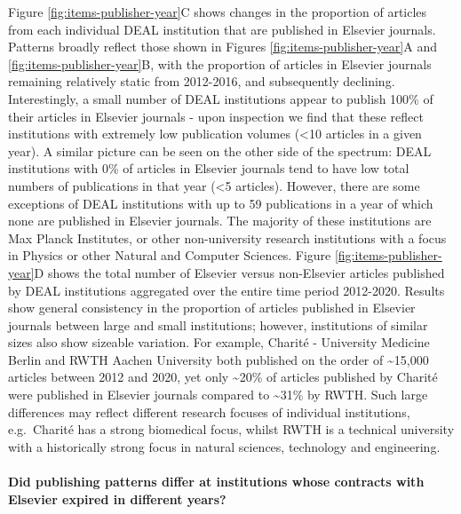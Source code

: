 \documentclass[
]{article}
\begin{document}
Figure \ref{fig:items-publisher-year}C shows changes in the proportion of articles from each individual DEAL institution that are published in Elsevier journals. Patterns broadly reflect those shown in Figures \ref{fig:items-publisher-year}A and \ref{fig:items-publisher-year}B, with the proportion of articles in Elsevier journals remaining relatively static from 2012-2016, and subsequently declining. Interestingly, a small number of DEAL institutions appear to publish 100\% of their articles in Elsevier journals - upon inspection we find that these reflect institutions with extremely low publication volumes (\textless10 articles in a given year). A similar picture can be seen on the other side of the spectrum: DEAL institutions with 0\% of articles in Elsevier journals tend to have low total numbers of publications in that year (\textless5 articles). However, there are some exceptions of DEAL institutions with up to 59 publications in a year of which none are published in Elsevier journals. The majority of these institutions are Max Planck Institutes, or other non-university research institutions with a focus in Physics or other Natural and Computer Sciences. Figure \ref{fig:items-publisher-year}D shows the total number of Elsevier versus non-Elsevier articles published by DEAL institutions aggregated over the entire time period 2012-2020. Results show general consistency in the proportion of articles published in Elsevier journals between large and small institutions; however, institutions of similar sizes also show sizeable variation. For example, Charité - University Medicine Berlin and RWTH Aachen University both published on the order of \textasciitilde15,000 articles between 2012 and 2020, yet only \textasciitilde20\% of articles published by Charité were published in Elsevier journals compared to \textasciitilde31\% by RWTH. Such large differences may reflect different research focuses of individual institutions, e.g.~Charité has a strong biomedical focus, whilst RWTH is a technical university with a historically strong focus in natural sciences, technology and engineering.

\hypertarget{did-publishing-patterns-differ-at-institutions-whose-contracts-with-elsevier-expired-in-different-years}{%
\paragraph{Did publishing patterns differ at institutions whose contracts with Elsevier expired in different years?}\label{did-publishing-patterns-differ-at-institutions-whose-contracts-with-elsevier-expired-in-different-years}}
\end{document}
